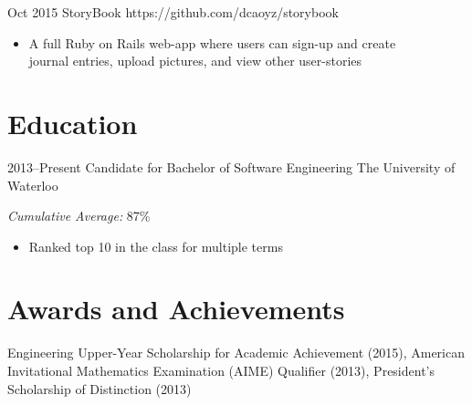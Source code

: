 \documentclass[print]{resume} %
\begin{document}
\begin{projlist}
\proj
{Oct 2015}
{StoryBook}
{https://github.com/dcaoyz/storybook}
{
\begin{itemize}
\item A full Ruby on Rails web-app where users can sign-up and create \\ journal entries, upload pictures, and view other user-stories
\end{itemize}}
\end{projlist}


\section{Education}

\begin{entrylist}
\entry
{2013--Present}
{{\normalfont Candidate for} Bachelor of Software Engineering}
{The University of Waterloo}
{\emph{Cumulative Average: }{87\%}
\begin{itemize}
\item Ranked top 10 in the class for multiple terms
\end{itemize}
}
\end{entrylist}


\section{Awards and Achievements}

Engineering Upper-Year Scholarship for Academic Achievement (2015), American Invitational Mathematics Examination (AIME) Qualifier (2013), President's Scholarship of Distinction (2013)
\end{document}

